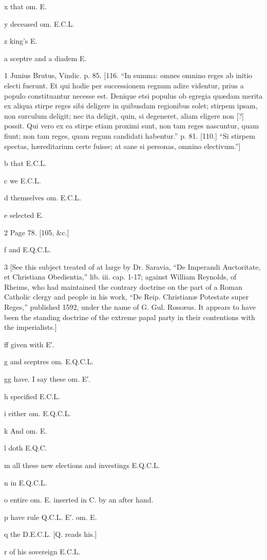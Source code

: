 x
that om. E.

y
deceased om. E.C.L.

z
king’s E.

a
sceptre and a diadem E.

1
Junius Brutus, Vindic. p. 85. [116. “In summa: omnes omnino reges ab initio electi fuerunt. Et qui hodie per successionem regnum adire videntur, prius a populo constituantur necesse est. Denique etsi populus ob egregia quædam merita ex aliqua stirpe reges sibi deligere in quibusdam regionibus solet; stirpem ipsam, non surculum deligit; nec ita deligit, quin, si degeneret, aliam eligere non [?] possit. Qui vero ex ea stirpe etiam proximi sunt, non tam reges nascuntur, quam fiunt; non tam reges, quam regum candidati habentur.” p. 81. [110.] “Si stirpem spectas, hæreditarium certe fuisse; at sane si personas, omnino electivum.”]

b
that E.C.L.

c
we E.C.L.

d
themselves om. E.C.L.

e
selected E.

2
Page 78. [105, &c.]

f
and E.Q.C.L.

3
[See this subject treated of at large by Dr. Saravia, “De Imperandi Auctoritate, et Christiana Obedientia,” lib. iii. cap. 1-17; against William Reynolds, of Rheims, who had maintained the contrary doctrine on the part of a Roman Catholic clergy and people in his work, “De Reip. Christianæ Potestate super Reges,” published 1592, under the name of G. Gul. Rossæus. It appears to have been the standing doctrine of the extreme papal party in their contentions with the imperialists.]

ff
given with E′.

g
and sceptres om. E.Q.C.L.

gg
have. I say these om. E′.

h
specified E.C.L.

i
either om. E.Q.C.L.

k
And om. E.

l
doth E.Q.C.

m
all these new elections and investings E.Q.C.L.

n
in E.Q.C.L.

o
entire om. E. inserted in C. by an after hand.

p
have rule Q.C.L. E′. om. E.

q
the D.E.C.L. [Q. reads his.]

r
of his sovereign E.C.L.

